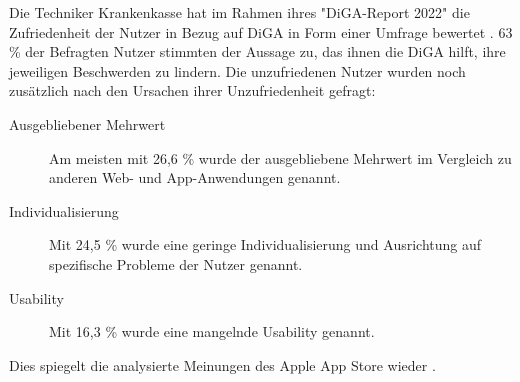 \documentclass{article}
\begin{document}
			Die Techniker Krankenkasse hat im Rahmen ihres "DiGA-Report 2022" die Zufriedenheit der Nutzer in Bezug auf DiGA in Form einer Umfrage bewertet \cite{TK-diga-report-1}. 63 \% der Befragten Nutzer stimmten der Aussage zu, das ihnen die DiGA hilft, ihre jeweiligen Beschwerden zu lindern. Die unzufriedenen Nutzer wurden noch zusätzlich nach den Ursachen ihrer Unzufriedenheit gefragt:
			\begin{description}
				\item[Ausgebliebener Mehrwert] Am meisten mit 26,6 \% wurde der ausgebliebene Mehrwert im Vergleich zu anderen Web- und App-Anwendungen genannt.
				\item[Individualisierung] Mit 24,5 \% wurde eine geringe Individualisierung und Ausrichtung auf spezifische Probleme der Nutzer genannt.
				\item[Usability] Mit 16,3 \% wurde eine mangelnde Usability genannt.    
			\end{description}
			Dies spiegelt die analysierte Meinungen des Apple App Store wieder \cite{frauenhofinstitut}.                 
\end{document}
